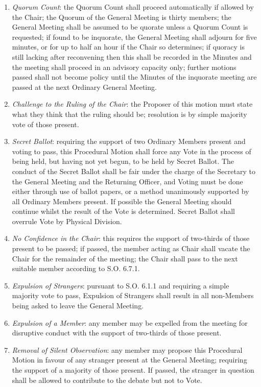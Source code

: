 \begin{enumerate}
\item \textit{Quorum Count}: the Quorum Count shall proceed automatically if allowed by the Chair; the Quorum of the General Meeting is thirty members; the General Meeting shall be assumed to be quorate unless a Quorum Count is requested; if found to be inquorate, the General Meeting shall adjourn for five minutes, or for up to half an hour if the Chair so determines; if quoracy is still lacking after reconvening then this shall be recorded in the Minutes and the meeting shall proceed in an advisory capacity only; further motions passed shall not become policy until the Minutes of the inquorate meeting are passed at the next Ordinary General Meeting.
\item \textit{Challenge to the Ruling of the Chair}: the Proposer of this motion must state what they think that the ruling should be; resolution is by simple majority vote of those present.
\item \textit{Secret Ballot}: requiring the support of two Ordinary Members present and voting to pass, this Procedural Motion shall force any Vote in the process of being held, but having not yet begun, to be held by Secret Ballot. The conduct of the Secret Ballot shall be fair under the charge of the Secretary to the General Meeting and the Returning Officer, and Voting must be done either through use of ballot papers, or a method unanimously supported by all Ordinary Members present. If possible the General Meeting should continue whilst the result of the Vote is determined. Secret Ballot shall overrule Vote by Physical Division.
\item \textit{No Confidence in the Chair}: this requires the support of two-thirds of those present to be passed; if passed, the member acting as Chair shall vacate the Chair for the remainder of the meeting; the Chair shall pass to the next suitable member according to S.O. 6.7.1.
\item \textit{Expulsion of Strangers}: pursuant to S.O. 6.1.1 and requiring a simple majority vote to pass, Expulsion of Strangers shall result in all non-Members being asked to leave the General Meeting.
\item \textit{Expulsion of a Member}: any member may be expelled from the meeting for disruptive conduct with the support of two-thirds of those present.
\item \textit{Removal of Silent Observation}: any member may propose this Procedural Motion in favour of any stranger present at the General Meeting; requiring the support of a majority of those present. If passed, the stranger in question shall be allowed to contribute to the debate but not to Vote.

\end{enumerate}
